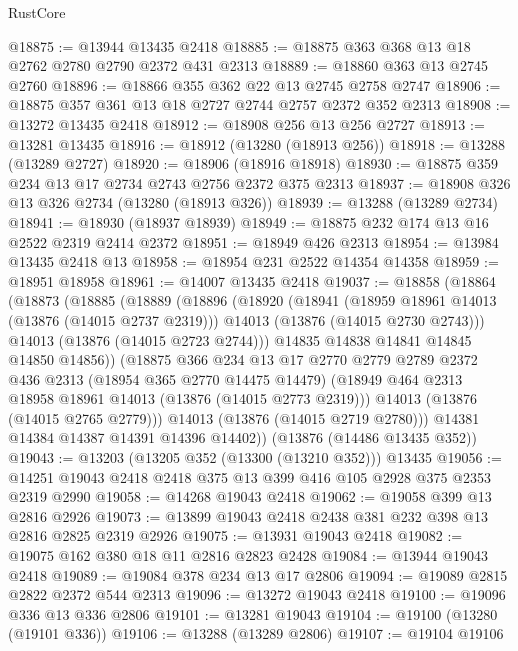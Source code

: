 \begin{lexlean}{RustCore}
\begin{coremodule}
@18875 := @13944 @13435 @2418
@18885 := @18875 @363 @368 @13 @18 @2762 @2780 @2790 @2372 @431 @2313
@18889 := @18860 @363 @13 @2745 @2760
@18896 := @18866 @355 @362 @22 @13 @2745 @2758 @2747
@18906 := @18875 @357 @361 @13 @18 @2727 @2744 @2757 @2372 @352 @2313
@18908 := @13272 @13435 @2418
@18912 := @18908 @256 @13 @256 @2727
@18913 := @13281 @13435
@18916 := @18912 (@13280 (@18913 @256))
@18918 := @13288 (@13289 @2727)
@18920 := @18906 (@18916 @18918)
@18930 := @18875 @359 @234 @13 @17 @2734 @2743 @2756 @2372 @375 @2313
@18937 := @18908 @326 @13 @326 @2734 (@13280 (@18913 @326))
@18939 := @13288 (@13289 @2734)
@18941 := @18930 (@18937 @18939)
@18949 := @18875 @232 @174 @13 @16 @2522 @2319 @2414 @2372
@18951 := @18949 @426 @2313
@18954 := @13984 @13435 @2418 @13
@18958 := @18954 @231 @2522 @14354 @14358
@18959 := @18951 @18958
@18961 := @14007 @13435 @2418
@19037 := @18858
    (@18864
      (@18873
        (@18885
          (@18889
            (@18896
              (@18920
                (@18941
                  (@18959 @18961 @14013 (@13876 (@14015 @2737 @2319)))
                  @14013
                  (@13876 (@14015 @2730 @2743)))
                @14013
                (@13876 (@14015 @2723 @2744)))
              @14835
              @14838
              @14841
              @14845
              @14850
              @14856))
          (@18875
            @366
            @234
            @13
            @17
            @2770
            @2779
            @2789
            @2372
            @436
            @2313
            (@18954 @365 @2770 @14475 @14479)
            (@18949 @464 @2313 @18958 @18961 @14013 (@13876 (@14015 @2773 @2319)))
            @14013
            (@13876 (@14015 @2765 @2779)))
          @14013
          (@13876 (@14015 @2719 @2780)))
        @14381
        @14384
        @14387
        @14391
        @14396
        @14402))
    (@13876 (@14486 @13435 @352))
@19043 := @13203 (@13205 @352 (@13300 (@13210 @352))) @13435
@19056 := @14251 @19043 @2418 @2418 @375 @13 @399 @416 @105 @2928 @375 @2353 @2319 @2990
@19058 := @14268 @19043 @2418
@19062 := @19058 @399 @13 @2816 @2926
@19073 := @13899 @19043 @2418 @2438 @381 @232 @398 @13 @2816 @2825 @2319 @2926
@19075 := @13931 @19043 @2418
@19082 := @19075 @162 @380 @18 @11 @2816 @2823 @2428
@19084 := @13944 @19043 @2418
@19089 := @19084 @378 @234 @13 @17 @2806
@19094 := @19089 @2815 @2822 @2372 @544 @2313
@19096 := @13272 @19043 @2418
@19100 := @19096 @336 @13 @336 @2806
@19101 := @13281 @19043
@19104 := @19100 (@13280 (@19101 @336))
@19106 := @13288 (@13289 @2806)
@19107 := @19104 @19106

\end{coremodule}
\end{lexlean}
